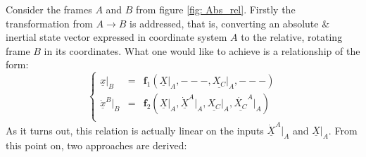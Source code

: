 %
\FloatBarrier
%
\indent Consider the frames $A$ and $B$ from figure \ref{fig:	Abs_rel}. Firstly the transformation from $A \rightarrow B$ is addressed, that is, converting an absolute \& inertial state vector expressed in coordinate system $A$ to the relative, rotating frame $B$ in its coordinates. What one would like to achieve is a relationship of the form:
%
\[
\left\{ \begin{array}{cccc}
\underline{x}\rvert_{B} 			& 	= 	& \bm f_1 \left( \underline{X}\rvert_{A}, ---, \underline{X_C}\rvert_{A}, ---\right) \\ 
\underline{\dot{x}}^{B}\rvert_{B} 	&  	= 	& \bm f_2 \left( \underline{X}\rvert_{A}, \underline{\dot{X}}^{A}\rvert_{A}, \underline{X_C}\rvert_{A}, \underline{\dot{X_C}}^{A}\rvert_{A}\right) \\
\end{array}
\right.
\]
%
\indent As it turns out, this relation is actually linear on the inputs $\underline{\dot{X}}^{A}\rvert_{A}$ and  $\underline{X}\rvert_{A}$. From this point on, two approaches are derived:
%
